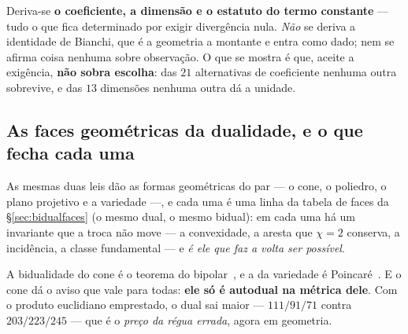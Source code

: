 \documentclass[livro.tex]{subfiles}
\begin{document}

\begin{obs}\label{obs:campo}
Deriva-se \textbf{o coeficiente, a dimensão e o estatuto do termo constante} --- tudo o que fica
determinado por exigir divergência nula. \emph{Não} se deriva a identidade de Bianchi, que é a
geometria a montante e entra como dado; nem se afirma coisa nenhuma sobre observação. O que se
mostra é que, aceite a exigência, \textbf{não sobra escolha}: das $21$ alternativas de coeficiente
nenhuma outra sobrevive, e das $13$ dimensões nenhuma outra dá a unidade.
\end{obs}

\subsection{As faces geométricas da dualidade, e o que fecha cada uma}\label{sec:geofaces}

As mesmas duas leis dão as formas geométricas do par --- o cone, o poliedro, o plano projetivo e a
variedade ---, e cada uma é uma linha da tabela de faces da \S\ref{sec:bidualfaces} (o mesmo dual, o
mesmo bidual): em cada uma há um invariante que a troca não move --- a convexidade, a aresta que
$\chi=2$ conserva, a incidência, a classe fundamental --- e \emph{é ele que faz a volta ser
possível}.

\noindent A bidualidade do cone é o teorema do bipolar~\cite{rockafellar}, e a da variedade é
Poincaré~\cite{thurston}. E o cone dá o aviso que vale para todas: \textbf{ele só é autodual na
métrica dele}. Com o
produto euclidiano emprestado, o dual sai maior --- $111/91/71$ contra $203/223/245$ --- que é o
\emph{preço da régua errada}, agora em geometria.

\end{document}
